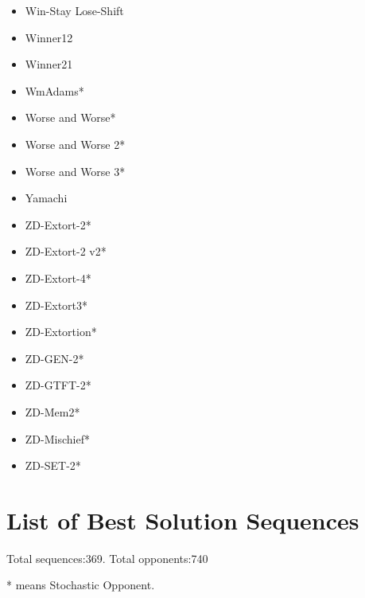 \begin{appendices}
\begin{multicols}{4}
\begin{itemize}
            \item Win-Stay Lose-Shift
            \item Winner12
            \item Winner21
            \item WmAdams*
            \item Worse and Worse*
            \item Worse and Worse 2*
            \item Worse and Worse 3*
            \item Yamachi
            \item ZD-Extort-2*
            \item ZD-Extort-2 v2*
            \item ZD-Extort-4*
            \item ZD-Extort3*
            \item ZD-Extortion*
            \item ZD-GEN-2*
            \item ZD-GTFT-2*
            \item ZD-Mem2*
            \item ZD-Mischief*
            \item ZD-SET-2*
        \end{itemize}
    \end{multicols}

    \chapter{List of Best Solution Sequences}\label{apndx:solutionGroups}
    Total sequences:369. Total opponents:740

    * means Stochastic Opponent.


\end{appendices}
